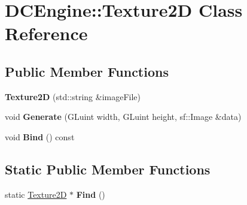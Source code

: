 \hypertarget{classDCEngine_1_1Texture2D}{\section{D\-C\-Engine\-:\-:Texture2\-D Class Reference}
\label{classDCEngine_1_1Texture2D}
}
\subsection*{Public Member Functions}
\begin{DoxyCompactItemize}
\item 
\hypertarget{classDCEngine_1_1Texture2D_a7879365b2c94ddcf08e109c01a16ffc8}{{\bfseries Texture2\-D} (std\-::string \&image\-File)}\label{classDCEngine_1_1Texture2D_a7879365b2c94ddcf08e109c01a16ffc8}

\item 
\hypertarget{classDCEngine_1_1Texture2D_adcb2f15714452541d53d17e12a218974}{void {\bfseries Generate} (G\-Luint width, G\-Luint height, sf\-::\-Image \&data)}\label{classDCEngine_1_1Texture2D_adcb2f15714452541d53d17e12a218974}

\item 
\hypertarget{classDCEngine_1_1Texture2D_ac3ff98429c5cfd23552d4729ecf0f226}{void {\bfseries Bind} () const }\label{classDCEngine_1_1Texture2D_ac3ff98429c5cfd23552d4729ecf0f226}

\end{DoxyCompactItemize}
\subsection*{Static Public Member Functions}
\begin{DoxyCompactItemize}
\item 
\hypertarget{classDCEngine_1_1Texture2D_a2bda5195e1a22d35fbdbfde6707af515}{static \hyperlink{classDCEngine_1_1Texture2D}{Texture2\-D} $\ast$ {\bfseries Find} ()}\label{classDCEngine_1_1Texture2D_a2bda5195e1a22d35fbdbfde6707af515}

\end{DoxyCompactItemize}
